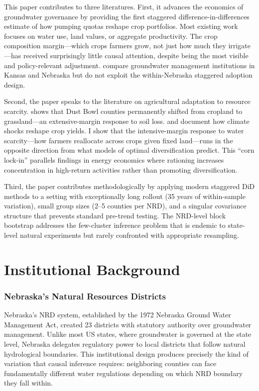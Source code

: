 \documentclass[12pt]{article}
\begin{document}
This paper contributes to three literatures. First, it advances the economics of groundwater governance \citep{pfeiffer2020ogallala, edwards2016groundwater, brozovic2010dynamic, drysdale2023mandate} by providing the first staggered difference-in-differences estimate of how pumping quotas reshape crop portfolios. Most existing work focuses on water use, land values, or aggregate productivity. The crop composition margin---which crops farmers grow, not just how much they irrigate---has received surprisingly little causal attention, despite being the most visible and policy-relevant adjustment. \citet{drysdale2023mandate} compare groundwater management institutions in Kansas and Nebraska but do not exploit the within-Nebraska staggered adoption design.

Second, the paper speaks to the literature on agricultural adaptation to resource scarcity. \citet{hornbeck2012enduring} shows that Dust Bowl counties permanently shifted from cropland to grassland---an extensive-margin response to soil loss. \citet{schlenker2009nonlinear} and \citet{ortizBobea2021anthropogenic} document how climate shocks reshape crop yields. I show that the intensive-margin response to water scarcity---how farmers reallocate across crops given fixed land---runs in the opposite direction from what models of optimal diversification predict. This ``corn lock-in'' parallels findings in energy economics where rationing increases concentration in high-return activities rather than promoting diversification.

Third, the paper contributes methodologically by applying modern staggered DiD methods \citep{callaway2021difference, goodmanbacon2021difference, sun2021estimating} to a setting with exceptionally long rollout (35 years of within-sample variation), small group sizes (2--5 counties per NRD), and a singular covariance structure that prevents standard pre-trend testing. The NRD-level block bootstrap addresses the few-cluster inference problem \citep{young2019channeling} that is endemic to state-level natural experiments but rarely confronted with appropriate resampling.


\section{Institutional Background}

\subsubsection*{Nebraska's Natural Resources Districts} Nebraska's NRD system, established by the 1972 Nebraska Ground Water Management Act, created 23 districts with statutory authority over groundwater management. Unlike most US states, where groundwater is governed at the state level, Nebraska delegates regulatory power to local districts that follow natural hydrological boundaries. This institutional design produces precisely the kind of variation that causal inference requires: neighboring counties can face fundamentally different water regulations depending on which NRD boundary they fall within.
\end{document}

